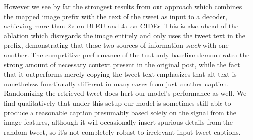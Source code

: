 \documentclass{article} %
\begin{document}
However we see by far the strongest results from our approach which combines the mapped image prefix with the text of the tweet as input to a decoder, achieving more than 2x on BLEU and 4x on CIDEr.
This is also ahead of the ablation which disregards the image entirely and only uses the tweet text in the prefix, demonstrating that these two sources of information \textit{stack} with one another.
The competitive performance of the text-only baseline demonstrates the strong amount of necessary context present in the original post, while the fact that it outperforms merely copying the tweet text emphasizes that alt-text is nonetheless functionally different in many cases from just another caption.
Randomizing the retrieved tweet does hurt our model's performance as well.
We find qualitatively that under this setup our model is sometimes still able to produce a reasonable caption presumably based solely on the signal from the image features, although it will occasionally insert spurious details from the random tweet, so it’s not completely robust to irrelevant input tweet captions.

\end{document}

